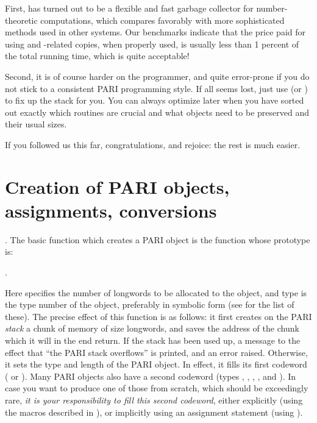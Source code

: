 First,  has turned out to be a flexible and fast garbage
collector for number-theoretic computations, which compares favorably with
more sophisticated methods used in other systems. Our benchmarks indicate
that the price paid for using  and -related
copies, when properly used, is usually less than 1 percent of the total
running time, which is quite acceptable!

Second, it is of course harder on the programmer, and quite error-prone
if you do not stick to a consistent PARI programming style. If all seems
lost, just use  (or ) to fix up the stack
for you. You can always optimize later when you have sorted out exactly which
routines are crucial and what objects need to be preserved and their usual
sizes.

\smallskip If you followed us this far, congratulations, and rejoice: the
rest is much easier.

\section{Creation of PARI objects, assignments, conversions}

.
The basic function which creates a PARI object is the function
 whose prototype is:

.

\noindent
Here  specifies the number of longwords to be allocated to the
object, and type is the type number of the object, preferably in symbolic
form (see  for the list of these). The precise effect of
this function is as follows: it first creates on the PARI \emph{stack} a
chunk of memory of size  longwords, and saves the address of the
chunk which it will in the end return. If the stack has been used up, a
message to the effect that ``the PARI stack overflows'' is printed,
and an error raised. Otherwise, it sets the type and length of the PARI object.
In effect, it fills its first codeword ( or ). Many PARI
objects also have a second codeword (types , ,
, , and ). In case you want to produce one of
those from scratch, which should be exceedingly rare, \emph{it is your
responsibility to fill this second codeword}, either explicitly (using the
macros described in ), or implicitly using an assignment
statement (using ).


